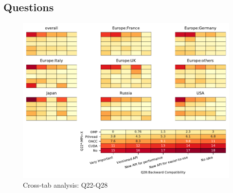 
\subsection{Questions}


\begin{figure}
\begin{center}
\includegraphics[width=12cm]{../pdfs/Q22-Q28.pdf}
\caption{Cross-tab analysis: Q22-Q28}
\label{fig:Q22-Q28}
\end{center}
\end{figure}
